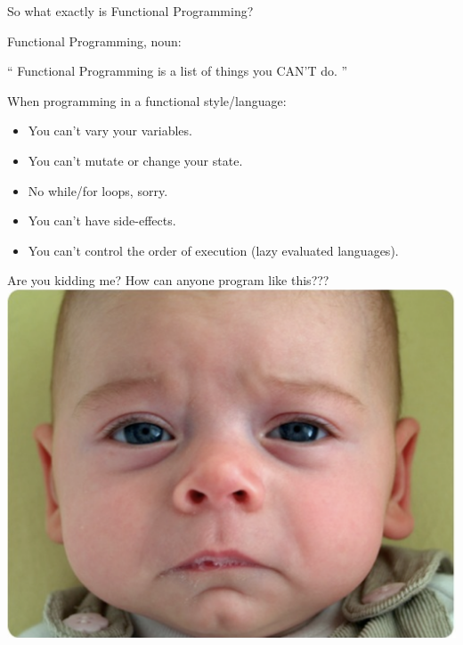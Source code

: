 \documentclass{beamer}
\begin{document}
\begin{frame}{}
  So what exactly is Functional Programming?
\end{frame}

\begin{frame}{Functional Programming, noun:}

  \begin{exampleblock}{}
    {\Huge ``
      Functional Programming is a list of things you CAN’T do.
      ''}
    \vskip5mm
    \hspace*{}
  \end{exampleblock}
\end{frame}

\begin{frame}
  When programming in a functional style/language:
  \begin{itemize}[<+->]
  \item You can't vary your variables.
  \item You can't mutate or change your state.
  \item No while/for loops, sorry.
  \item You can't have side-effects.
  \item You can't control the order of execution (lazy evaluated languages).
  \end{itemize}
\end{frame}

\begin{frame}{Are you kidding me?}
  How can anyone program like this???
  \includegraphics[scale=0.3]{img/sadbaby.png}
\end{frame}
\end{document}
